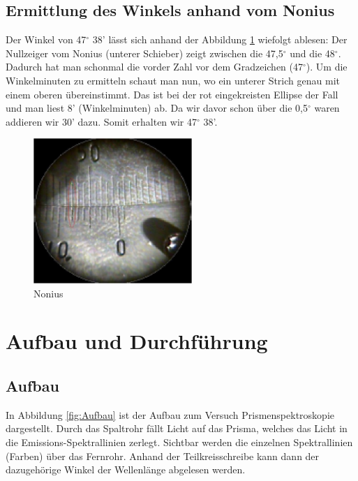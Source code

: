 \documentclass[a4paper]{scrartcl}
\numberwithin{equation}{subsection}
\begin{document}
\subsection{Ermittlung des Winkels anhand vom Nonius}
Der Winkel von 47$^\circ$ 38' lässt sich anhand der Abbildung \ref{fig:Nonius} wiefolgt ablesen:
Der Nullzeiger vom Nonius (unterer Schieber) zeigt zwischen die 47,5$^\circ$ und die 48$^\circ$.
Dadurch hat man schonmal die vorder Zahl vor dem Gradzeichen (47$^\circ$).
Um die Winkelminuten zu ermitteln schaut man nun, wo ein unterer Strich genau mit einem oberen übereinstimmt.
Das ist bei der rot eingekreisten Ellipse der Fall und man liest 8' (Winkelminuten) ab.
Da wir davor schon über die 0,5$^\circ$ waren addieren wir 30' dazu.
Somit erhalten wir 47$^\circ$ 38'.

\begin{figure}[H]
	\includegraphics[width=6cm]{Abbildungen/Nonius}
	\centering
	\caption{Nonius \cite{anl}}
	\centering
	\label{fig:Nonius}
\end{figure}

\newpage
\section{Aufbau und Durchführung}
\subsection{Aufbau}
In Abbildung \ref{fig:Aufbau} ist der Aufbau zum Versuch Prismenspektroskopie dargestellt.
Durch das Spaltrohr fällt Licht auf das Prisma, welches das Licht in die Emissions-Spektrallinien zerlegt.
Sichtbar werden die einzelnen Spektrallinien (Farben) über das Fernrohr.
Anhand der Teilkreisschreibe kann dann der dazugehörige Winkel der Wellenlänge abgelesen werden.
\end{document}

